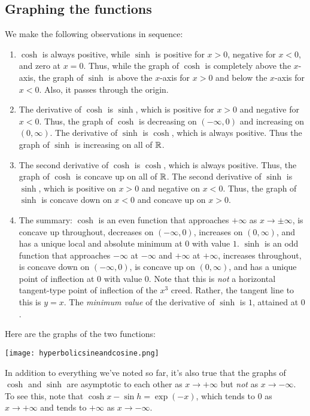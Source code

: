 \documentclass{amsart}
\begin{document}
\subsection{Graphing the functions}

We make the following observations in sequence:

\begin{enumerate}
\item $\cosh$ is always positive, while $\sinh$ is positive for $x >
  0$, negative for $x < 0$, and zero at $x = 0$. Thus, while the graph
  of $\cosh$ is completely above the $x$-axis, the graph of $\sinh$ is
  above the $x$-axis for $x > 0$ and below the $x$-axis for $x <
  0$. Also, it passes through the origin.
\item The derivative of $\cosh$ is $\sinh$, which is positive for $x >
  0$ and negative for $x < 0$. Thus, the graph of $\cosh$ is
  decreasing on $(-\infty,0)$ and increasing on $(0,\infty)$. The
  derivative of $\sinh$ is $\cosh$, which is always positive. Thus the
  graph of $\sinh$ is increasing on all of $\mathbb{R}$.
\item The second derivative of $\cosh$ is $\cosh$, which is always
  positive. Thus, the graph of $\cosh$ is concave up on all of
  $\mathbb{R}$. The second derivative of $\sinh$ is $\sinh$, which is positive
  on $x > 0$ and negative on $x < 0$. Thus, the graph of $\sinh$ is
  concave down on $x < 0$ and concave up on $x > 0$.
\item The summary: $\cosh$ is an even function that approaches
  $+\infty$ as $x \to \pm \infty$, is concave up throughout, decreases
  on $(-\infty,0)$, increases on $(0,\infty)$, and has a unique local
  and absolute minimum at $0$ with value $1$. $\sinh$ is an odd
  function that approaches $-\infty$ at $-\infty$ and $+\infty$ at
  $+\infty$, increases throughout, is concave down on $(-\infty,0)$,
  is concave up on $(0,\infty)$, and has a unique point of inflection
  at $0$ with value $0$. Note that this is {\em not} a horizontal
  tangent-type point of inflection of the $x^3$ creed. Rather, the
  tangent line to this is $y = x$. The {\em minimum value} of the
  derivative of $\sinh$ is $1$, attained at $0$.
\end{enumerate}

Here are the graphs of the two functions:

\texttt{[image: hyperbolicsineandcosine.png]}

In addition to everything we've noted so far, it's also true that the
graphs of $\cosh$ and $\sinh$ are asymptotic to each other as $x \to
+\infty$ but {\em not} as $x \to -\infty$. To see this, note that
$\cosh x - \sin h = \exp(-x)$, which tends to $0$ as $x \to +\infty$
and tends to $+\infty$ as $x \to -\infty$.
\end{document}
